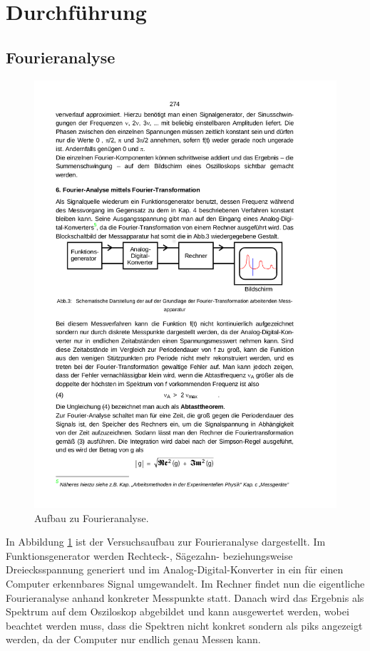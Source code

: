 \section{Durchführung}
\label{sec:Durchführung}

\subsection{Fourieranalyse}
\begin{figure}[H]
  \centering
  \includegraphics{content/images/analyse2.png}
  \caption{Aufbau zu Fourieranalyse.}
  \label{fig:anal}
\end{figure}
In Abbildung \ref{fig:anal} ist der Versuchsaufbau zur Fourieranalyse
dargestellt. Im Funktionsgenerator werden Rechteck-, Sägezahn- beziehungsweise
Dreiecksspannung generiert und im Analog-Digital-Konverter in ein für einen
Computer erkennbares Signal umgewandelt. Im Rechner findet nun die
eigentliche Fourieranalyse anhand konkreter Messpunkte statt.
Danach wird das Ergebnis als Spektrum auf dem Osziloskop abgebildet
und kann ausgewertet werden, wobei beachtet werden muss, dass die
Spektren nicht konkret sondern als piks angezeigt werden, da der
Computer nur endlich genau Messen kann.

